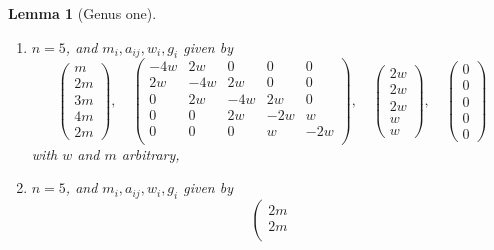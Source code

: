 \documentclass{stacks-project}
\theoremstyle{plain}
\newtheorem{lemma}[subsection]{Lemma}
\theoremstyle{definition}
\theoremstyle{remark}
\numberwithin{equation}{subsection}
\begin{document}
\begin{lemma}[Genus one]
\begin{enumerate}
$$\begin{matrix}
0 & 0 & 0 & 2w & -4w \\
\end{matrix}
\right),
\quad
\left(
\begin{matrix}
w \\
w \\
w \\
2w \\
2w
\end{matrix}
\right),
\quad
\left(
\begin{matrix}
0 \\
0 \\
0 \\
0 \\
0
\end{matrix}
\right)
$$
with $w$ and $m$ arbitrary,
\item
\label{item-equal-equal-down-equal}
$n = 5$, and $m_i, a_{ij}, w_i, g_i$ given by
$$
\left(
\begin{matrix}
m \\
2m \\
3m \\
4m \\
2m
\end{matrix}
\right),
\quad
\left(
\begin{matrix}
-4w & 2w & 0 & 0 & 0 \\
2w & -4w & 2w & 0 & 0 \\
0 & 2w & -4w & 2w & 0 \\
0 & 0 & 2w & -2w & w \\
0 & 0 & 0 & w & -2w \\
\end{matrix}
\right),
\quad
\left(
\begin{matrix}
2w \\
2w \\
2w \\
w \\
w
\end{matrix}
\right),
\quad
\left(
\begin{matrix}
0 \\
0 \\
0 \\
0 \\
0
\end{matrix}
\right)
$$
with $w$ and $m$ arbitrary,
\item
\label{item-up-equal-equal-up}
$n = 5$, and $m_i, a_{ij}, w_i, g_i$ given by
$$
\left(
\begin{matrix}
2m \\
2m \\

\end{matrix}$$
\end{enumerate}
\end{lemma}
\end{document}
